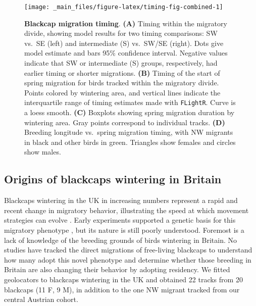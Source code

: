 \documentclass[a4paper, nobind]{templates/ociamthesis}
\begin{document}
\begin{figure}
\texttt{[image: \_main\_files/figure-latex/timing-fig-combined-1]} \caption{\textbf{Blackcap migration timing}. \textbf{(A)} Timing within the migratory divide, showing model results for two timing comparisons: SW vs.~SE (left) and intermediate (S) vs.~SW/SE (right). Dots give model estimate and bars 95\% confidence interval. Negative values indicate that SW or intermediate (S) groups, respectively, had earlier timing or shorter migrations. \textbf{(B)} Timing of the start of spring migration for birds tracked within the migratory divide. Points colored by wintering area, and vertical lines indicate the interquartile range of timing estimates made with \texttt{FLightR}. Curve is a loess smooth. \textbf{(C)} Boxplots showing spring migration duration by wintering area. Gray points correspond to individual tracks. \textbf{(D)} Breeding longitude vs.~spring migration timing, with NW migrants in black and other birds in green. Triangles show females and circles show males.}\label{fig:timing-fig-combined}
\end{figure}

\hypertarget{origins-of-blackcaps-wintering-in-britain}{%
\subsection{Origins of blackcaps wintering in Britain}\label{origins-of-blackcaps-wintering-in-britain}}

Blackcaps wintering in the UK in increasing numbers represent a rapid and recent change in migratory behavior, illustrating the speed at which movement strategies can evolve \autocite{bertholdMigratoryBehaviourPopulation1988,leachWinteringBlackcapsBritain1981}.
Early experiments supported a genetic basis for this migratory phenotype \autocite{bertholdRapidMicroevolutionMigratory1992,helbigInheritanceNovelMigratory1994}, but its nature is still poorly understood.
Foremost is a lack of knowledge of the breeding grounds of birds wintering in Britain.
No studies have tracked the direct migrations of free-living blackcaps to understand how many adopt this novel phenotype and determine whether those breeding in Britain are also changing their behavior by adopting residency.
We fitted geolocators to blackcaps wintering in the UK and obtained 22 tracks from 20 blackcaps (11 F, 9 M), in addition to the one NW migrant tracked from our central Austrian cohort.
\end{document}
